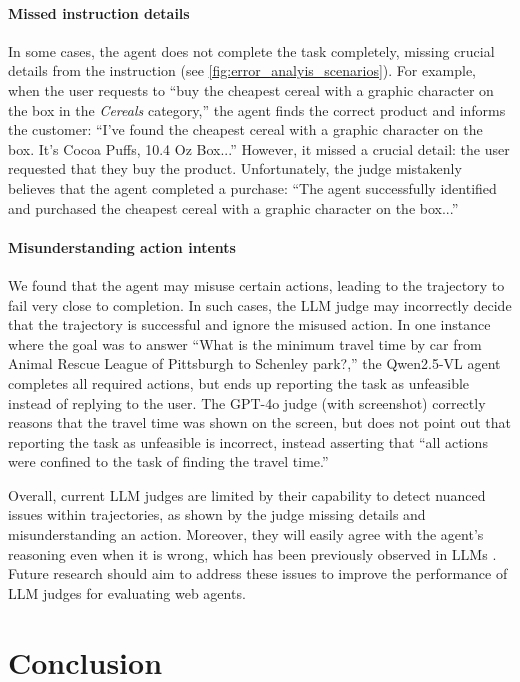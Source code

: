 \documentclass{article} %
\begin{document}
\paragraph{Missed instruction details}
In some cases, the agent does not complete the task completely, missing crucial details from the instruction (see \cref{fig:error_analyis_scenarios}).
For example, when the user requests to ``buy the cheapest cereal with a graphic character on the box in the \textit{Cereals} category,'' the agent finds the correct product and informs the customer: ``I've found the cheapest cereal with a graphic character on the box. It's Cocoa Puffs, 10.4 Oz Box...''
However, it missed a crucial detail: the user requested that they buy the product. Unfortunately, the judge mistakenly believes that the agent completed a purchase: ``The agent successfully identified and purchased the cheapest cereal with a graphic character on the box...''


\paragraph{Misunderstanding action intents}
We found that the agent may misuse certain actions, leading to the trajectory to fail very close to completion. In such cases, the LLM judge may incorrectly decide that the trajectory is successful and ignore the misused action. In one instance where the goal was to answer ``What is the minimum travel time by car from Animal Rescue League of Pittsburgh to Schenley park?,'' the Qwen2.5-VL agent completes all required actions, but ends up reporting the task as unfeasible instead of replying to the user. The GPT-4o judge (with screenshot) correctly reasons that the travel time was shown on the screen, but does not point out that reporting the task as unfeasible is incorrect, instead asserting that ``all actions were confined to the task of finding the travel time.''

Overall, current LLM judges are limited by their capability to detect nuanced issues within trajectories, as shown by the judge missing details and misunderstanding an action. Moreover, they will easily agree with the agent's reasoning even when it is wrong, which has been previously observed in LLMs \citep{sharma2023understandingsycophancylanguagemodels}. Future research should aim to address these issues to improve the performance of LLM judges for evaluating web agents.




\section{Conclusion}
\label{sec:conclusion}
\end{document}
